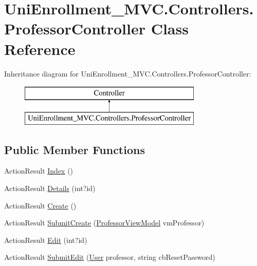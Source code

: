 \hypertarget{class_uni_enrollment___m_v_c_1_1_controllers_1_1_professor_controller}{}\section{Uni\+Enrollment\+\_\+\+M\+V\+C.\+Controllers.\+Professor\+Controller Class Reference}
\label{class_uni_enrollment___m_v_c_1_1_controllers_1_1_professor_controller}


 


Inheritance diagram for Uni\+Enrollment\+\_\+\+M\+V\+C.\+Controllers.\+Professor\+Controller\+:\begin{figure}[H]
\begin{center}
\leavevmode
\includegraphics[height=2.000000cm]{class_uni_enrollment___m_v_c_1_1_controllers_1_1_professor_controller}
\end{center}
\end{figure}
\subsection*{Public Member Functions}
\begin{DoxyCompactItemize}
\item 
Action\+Result \hyperlink{class_uni_enrollment___m_v_c_1_1_controllers_1_1_professor_controller_a4e043a0a91774c6c4c717e20491bd07e}{Index} ()
\item 
Action\+Result \hyperlink{class_uni_enrollment___m_v_c_1_1_controllers_1_1_professor_controller_aeee3fc968f7143e40fb72435a2a52362}{Details} (int?id)
\item 
Action\+Result \hyperlink{class_uni_enrollment___m_v_c_1_1_controllers_1_1_professor_controller_af361fb8ef6501711881963e5811d0e8d}{Create} ()
\item 
Action\+Result \hyperlink{class_uni_enrollment___m_v_c_1_1_controllers_1_1_professor_controller_a608bfecc8e3f96672690c8d440e579c9}{Submit\+Create} (\hyperlink{class_uni_enrollment___m_v_c_1_1_models_1_1_professor_view_model}{Professor\+View\+Model} vm\+Professor)
\item 
Action\+Result \hyperlink{class_uni_enrollment___m_v_c_1_1_controllers_1_1_professor_controller_a5eac6c88d51b3528f8fbb5f0902a9bc7}{Edit} (int?id)
\item 
Action\+Result \hyperlink{class_uni_enrollment___m_v_c_1_1_controllers_1_1_professor_controller_ae9f81c9967f5210789cf46a9ddab53ea}{Submit\+Edit} (\hyperlink{class_uni_enrollment___m_v_c_1_1_models_1_1_user}{User} professor, string cb\+Reset\+Password)
\end{DoxyCompactItemize}
